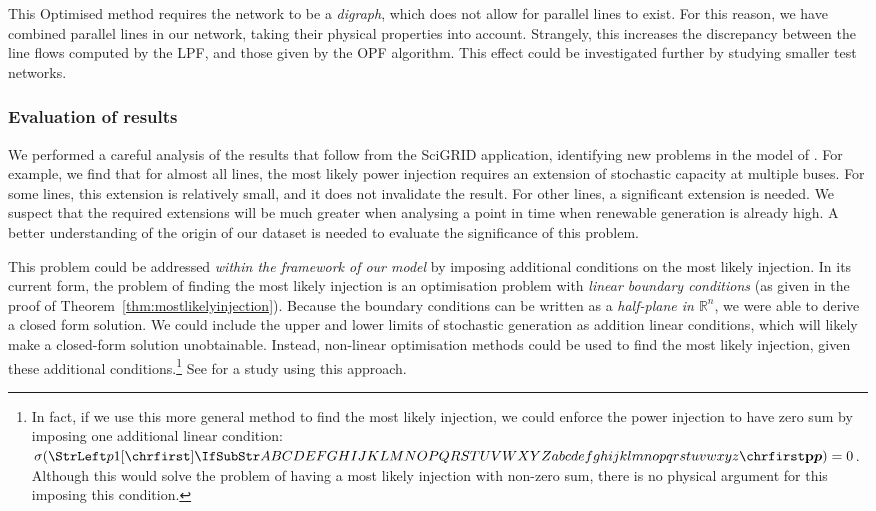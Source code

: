 \documentclass[main.tex]{subfiles}
\begin{document}
This Optimised method requires the network to be a \emph{digraph}, which does not allow for parallel lines to exist. For this reason, we have combined parallel lines in our network, taking their physical properties into account. Strangely, this increases the discrepancy between the line flows computed by the LPF, and those given by the OPF algorithm. This effect could be investigated further by studying smaller test networks.


\subsubsection{Evaluation of results}
We performed a careful analysis of the results that follow from the SciGRID application, identifying new problems in the model of \cite{Nesti2018emergentfailures}. For example, we find that for almost all lines, the most likely power injection requires an extension of stochastic capacity at multiple buses. For some lines, this extension is relatively small, and it does not invalidate the result. For other lines, a significant extension is needed. We suspect that the required extensions will be much greater when analysing a point in time when renewable generation is already high. A better understanding of the origin of our dataset is needed to evaluate the significance of this problem.

This problem could be addressed \emph{within the framework of our model} by imposing additional conditions on the most likely injection. In its current form, the problem of finding the most likely injection is an optimisation problem with \emph{linear boundary conditions} (as given in the proof of Theorem~\ref{thm:mostlikelyinjection}). Because the boundary conditions can be written as a \emph{half-plane in $\mathbb{R}^n$}, we were able to derive a closed form solution. We could include the upper and lower limits of stochastic generation as addition linear conditions, which will likely make a closed-form solution unobtainable. Instead, non-linear optimisation methods could be used to find the most likely injection, given these additional conditions.\footnote{In fact, if we use this more general method to find the most likely injection, we could enforce the power injection to have zero sum by imposing one additional linear condition: $\sigma (\mat{p}) = 0$. Although this would solve the problem of having a most likely injection with non-zero sum, there is no physical argument for this imposing this condition.} See \cite{Chertkov2011} for a study using this approach.
\end{document}
